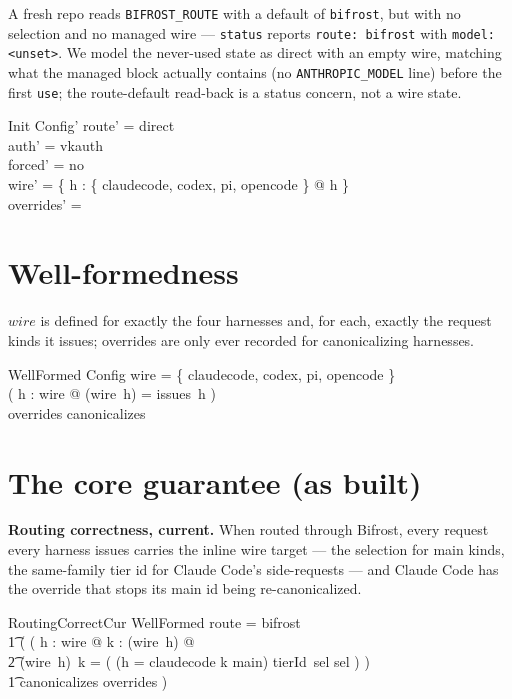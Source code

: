 \documentclass{article}
\begin{document}
A fresh repo reads \texttt{BIFROST\_ROUTE} with a default of \texttt{bifrost},
but with no selection and no managed wire --- \texttt{status} reports
\texttt{route: bifrost} with \texttt{model: <unset>}. We model the never-used
state as direct with an empty wire, matching what the managed block actually
contains (no \texttt{ANTHROPIC\_MODEL} line) before the first \texttt{use};
the route-default read-back is a status concern, not a wire state.

\begin{schema}{Init}
  Config'
\where
  route' = direct \\
  auth' = vkauth \\
  forced' = no \\
  wire' = \{ h : \{ claudecode, codex, pi, opencode \} @ h \mapsto \emptyset \} \\
  overrides' = \emptyset
\end{schema}

\section{Well-formedness}

$wire$ is defined for exactly the four harnesses and, for each, exactly the
request kinds it issues; overrides are only ever recorded for canonicalizing
harnesses.

\begin{schema}{WellFormed}
  Config
\where
  \dom wire = \{ claudecode, codex, pi, opencode \} \\
  ( \forall h : \dom wire @ \dom (wire~h) = issues~h ) \\
  overrides \subseteq canonicalizes
\end{schema}

\section{The core guarantee (as built)}

\textbf{Routing correctness, current.} When routed through Bifrost, every
request every harness issues carries the inline wire target --- the
selection for main kinds, the same-family tier id for Claude Code's
side-requests --- and Claude Code has the override that stops its main id being
re-canonicalized.

\begin{schema}{RoutingCorrectCur}
  WellFormed
\where
  route = bifrost \implies \\
  \t1 ( ( \forall h : \dom wire @ \forall k : \dom (wire~h) @ \\
  \t2     (wire~h)~k = ( \IF (h = claudecode \land k \neq main) \THEN tierId~sel \ELSE sel ) ) \land \\
  \t1   canonicalizes \subseteq overrides )
\end{schema}
\end{document}
